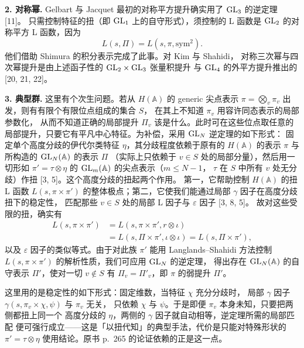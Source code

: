 \par\medskip\noindent\textbf{2. 对称幂.}\quad
Gelbart 与 Jacquet 最初的对称平方提升确实用了 $\mathrm{GL}_3$ 的逆定理 [11]。
只需控制特征的扭（即 $\mathrm{GL}_1$ 上的自守形式），须控制的 L 函数是 $\mathrm{GL}_2$
的对称平方 L 函数，因为
\[
  L(s,\Pi)=L(s,\pi,\mathrm{sym}^{2}).
\]
他们借助 Shimura 的积分表示完成了此事。对 Kim 与 Shahidi，
对称三次幂与四次幂提升是由上述函子性的 $\mathrm{GL}_2\times\mathrm{GL}_3$ 张量积提升
与 $\mathrm{GL}_4$ 的外平方提升推出的 [20, 21, 22]。

\par\medskip\noindent\textbf{3. 典型群.}\quad
这里有个次生问题。若从 $H(\mathbb{A})$ 的 generic 尖点表示
$\pi=\bigotimes_v\pi_v$ 出发，则有有限个有限位点组成的集合 $S$，
在其上不知道 $\pi_v$ 用容许同态表示的局部参数化，
从而不知道正确的局部提升 $\Pi_v$ 该是什么。此时可在这些位点取任意的
局部提升，只要它有平凡中心特征。为补偿，采用 $\mathrm{GL}_N$ 逆定理的如下形式：
固定单个高度分歧的伊代尔类特征 $\eta$，其分歧程度依赖于原有的
$H(\mathbb{A})$ 的表示 $\pi$ 与所构造的 $\mathrm{GL}_N(\mathbb{A})$ 的表示 $\Pi$
（实际上只依赖于 $v\in S$ 处的局部分量），然后用一切形如
$\pi'=\tau\otimes\eta$ 的 $\mathrm{GL}_m(\mathbb{A})$ 的尖点表示（$m\le N-1$，
$\tau$ 在 $S$ 中所有 $v$ 处无分歧）作扭 [3, 5]。这个高度分歧的扭起两个作用。
第一，它帮助控制 $H(\mathbb{A})$ 的扭 L 函数 $L(s,\pi\times\pi')$
的整体极点；第二，它使我们能通过局部 $\gamma$ 因子在高度分歧扭下的稳定性，
匹配那些 $v\in S$ 处的局部 L 因子与 $\varepsilon$ 因子 [3, 8, 5]。
故对这些受限的扭，确实有
\[
\begin{aligned}
  L(s,\pi\times\pi')&=L(s,\pi\times\pi',r\otimes\iota)\\
  &=L(s,\Pi\times\pi',\iota\otimes\iota)=L(s,\Pi\times\pi'),
\end{aligned}
\]
以及 $\varepsilon$ 因子的类似等式。由于对此族 $\pi'$ 能用 Langlands--Shahidi
方法控制 $L(s,\pi\times\pi')$ 的解析性质，我们可应用 $\mathrm{GL}_N$ 的逆定理，
得出存在 $\mathrm{GL}_N(\mathbb{A})$ 的自守表示 $\Pi'$，使对一切 $v\notin S$ 有
$\Pi_v=\Pi'_v$，即 $\pi$ 的弱提升 $\Pi'$。
\begin{annote}
这里用的是稳定性的如下形式：固定维数，当特征 $\chi$ 充分分歧时，
局部 $\gamma$ 因子 $\gamma(s,\pi_v\times\chi,\psi)$ 与 $\pi_v$ 无关，
只依赖 $\chi$ 与 $\psi$。于是即便 $\pi_v$ 本身未知，只要把两侧都扭上同一个
高度分歧的 $\eta$，两侧的 $\gamma$ 因子就自动相等，逆定理所需的局部匹配
便可强行成立——这是「以扭代知」的典型手法，代价是只能对特殊形状的
$\pi'=\tau\otimes\eta$ 使用结论。原书 p.~265 的论证依赖的正是这一点。
\par{}
\end{annote}

